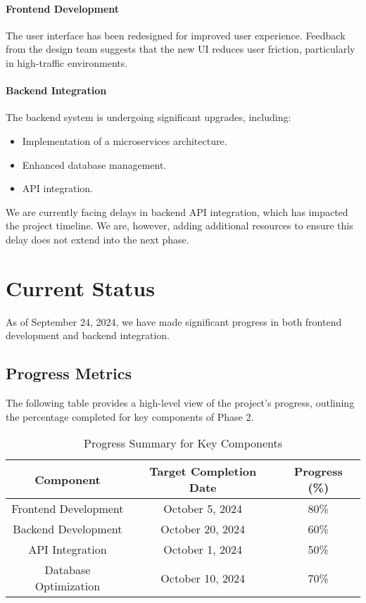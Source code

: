 \documentclass[12pt]{article}
\begin{document}
\paragraph{Frontend Development} The user interface has been redesigned for improved user experience. Feedback from the design team suggests that the new UI reduces user friction, particularly in high-traffic environments.

\paragraph{Backend Integration} The backend system is undergoing significant upgrades, including:
\begin{itemize}
    \item Implementation of a microservices architecture.
    \item Enhanced database management.
    \item API integration.
\end{itemize}

We are currently facing delays in backend API integration, which has impacted the project timeline. We are, however, adding additional resources to ensure this delay does not extend into the next phase.

\section{Current Status}
As of September 24, 2024, we have made significant progress in both frontend development and backend integration.

\subsection{Progress Metrics}
The following table provides a high-level view of the project's progress, outlining the percentage completed for key components of Phase 2.

\begin{table}[h!]
\centering
\begin{tabular}{|c|c|c|}
\hline
\textbf{Component} & \textbf{Target Completion Date} & \textbf{Progress (\%)} \\
\hline
Frontend Development & October 5, 2024 & 80\% \\
Backend Development & October 20, 2024 & 60\% \\
API Integration & October 1, 2024 & 50\% \\
Database Optimization & October 10, 2024 & 70\% \\
\hline
\end{tabular}
\caption{Progress Summary for Key Components}
\end{table}
\end{document}
